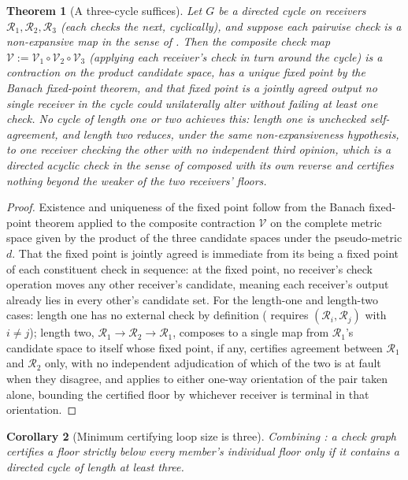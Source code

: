 \documentclass[11pt,twocolumn,a4paper]{article}
\theoremstyle{rdm}
\newtheorem{theorem}{Theorem}[section]
\newtheorem{corollary}[theorem]{Corollary}
\theoremstyle{definition}
\theoremstyle{remark}
\newcommand{\Rec}{\mathcal{R}}
\begin{document}
\begin{theorem}[A three-cycle suffices]
\label{thm:threecycle}
Let $G$ be a directed cycle on receivers $\Rec_1,\Rec_2,\Rec_3$ (each checks
the next, cyclically), and suppose each pairwise check is a non-expansive
map in the sense of . Then the composite check map
$\mathcal{V} := \mathcal{V}_1\circ\mathcal{V}_2\circ\mathcal{V}_3$ (applying
each receiver's check in turn around the cycle) is a contraction on the
product candidate space, has a unique fixed point by the Banach fixed-point
theorem, and that fixed point is a jointly agreed output no single receiver
in the cycle could unilaterally alter without failing at least one check.
No cycle of length one or two achieves this: length one is unchecked
self-agreement, and length two reduces, under the same non-expansiveness
hypothesis, to one receiver checking the other with no independent third
opinion, which is a directed acyclic check in the sense of
 composed with its own reverse and certifies nothing
beyond the weaker of the two receivers' floors.
\end{theorem}

\begin{proof}
Existence and uniqueness of the fixed point follow from the Banach
fixed-point theorem \citep{banach1922} applied to the composite contraction $\mathcal{V}$ on the
complete metric space given by the product of the three candidate spaces
under the pseudo-metric $d$. That the fixed point is jointly agreed is
immediate from its being a fixed point of each constituent check in
sequence: at the fixed point, no receiver's check operation moves any
other receiver's candidate, meaning each receiver's output already lies in
every other's candidate set. For the length-one and length-two cases: length
one has no external check by definition ( requires
$(\Rec_i,\Rec_j)$ with $i\ne j$); length two, $\Rec_1\to\Rec_2\to\Rec_1$,
composes to a single map from $\Rec_1$'s candidate space to itself whose
fixed point, if any, certifies agreement between $\Rec_1$ and $\Rec_2$ only,
with no independent adjudication of which of the two is at fault when they
disagree, and  applies to either one-way orientation
of the pair taken alone, bounding the certified floor by whichever receiver
is terminal in that orientation.
\end{proof}

\begin{corollary}[Minimum certifying loop size is three]
\label{cor:three-min}
Combining : a check graph certifies a floor
strictly below every member's individual floor only if it contains a
directed cycle of length at least three.
\end{corollary}
\end{document}
